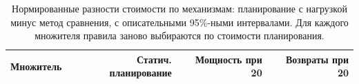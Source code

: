 \begin{table}[t]
\caption{Нормированные разности стоимости по механизмам: планирование с нагрузкой минус метод сравнения, с описательными 95\%-ными интервалами. Для каждого множителя правила заново выбираются по стоимости планирования.}\label{tab:e7sensitivity}
\centering\small\setlength{\tabcolsep}{3pt}
\begin{tabular}{lrrr}\toprule
Множитель & Статич. планирование & Мощность при 20 & Возвраты при 20\\\midrule

\end{tabular}
\end{table}
